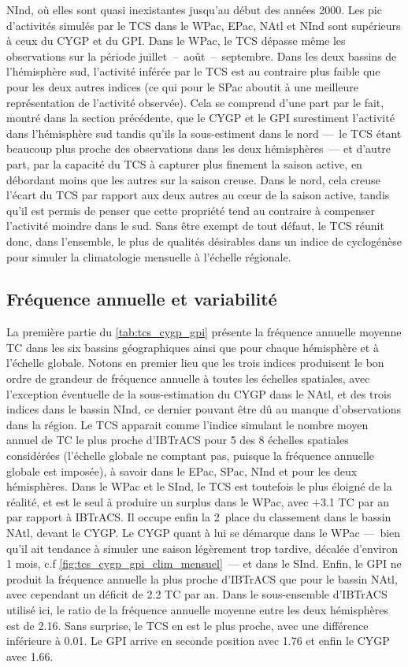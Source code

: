 \documentclass[../main.tex]{subfiles}
\begin{document}
NInd, où elles sont quasi inexistantes jusqu'au début des années 2000. Les pic d'activités simulés par le TCS dans le WPac, EPac, NAtl et NInd sont
supérieurs à ceux du CYGP et du GPI. Dans le WPac, le TCS dépasse même les observations sur la période juillet~--~août~--~septembre. Dans les deux bassins de
l'hémisphère sud, l'activité inférée par le TCS est au contraire plus faible que pour les deux autres indices (ce qui pour le SPac aboutit à une meilleure
représentation de l'activité observée). Cela se comprend d'une part par le fait, montré dans la section précédente, que le CYGP et le GPI surestiment l'activité
dans l'hémisphère sud tandis qu'ils la sous-estiment dans le nord ---~le TCS étant beaucoup plus proche des observations dans les deux hémisphères~--- et
d'autre part, par la capacité du TCS à capturer plus finement la saison active, en débordant moins que les autres sur la saison creuse. Dans le nord, cela
creuse l'écart du TCS par rapport aux deux autres au cœur de la saison active, tandis qu'il est permis de penser que cette propriété tend au contraire à
compenser l'activité moindre dans le sud. Sans être exempt de tout défaut, le TCS réunit donc, dans l'ensemble, le plus de qualités désirables dans un indice de
cyclogénèse pour simuler la climatologie mensuelle à l'échelle régionale.
\subsection*{Fréquence annuelle et variabilité}

La première partie du \cref{tab:tcs_cygp_gpi} présente la fréquence annuelle moyenne TC dans les six bassins géographiques ainsi que pour chaque hémisphère et à
l'échelle globale. Notons en premier lieu que les trois indices produisent le bon ordre de grandeur de fréquence annuelle à toutes les échelles spatiales, avec
l'exception éventuelle de la sous-estimation du CYGP dans le NAtl, et des trois indices dans le bassin NInd, ce dernier pouvant être dû au manque
d'observations dans la région. Le TCS apparait comme l'indice simulant le nombre moyen annuel de TC le plus proche d'IBTrACS pour \num{5} des \num{8} échelles
spatiales considérées (l'échelle globale ne comptant pas, puisque la fréquence annuelle globale est imposée), à savoir dans le EPac, SPac, NInd et pour les deux
hémisphères. Dans le WPac et le SInd, le TCS est toutefois le plus éloigné de la réalité, et est le seul à produire un surplus dans le WPac, avec $+$\num{3.1}
TC par an par rapport à IBTrACS. Il occupe enfin la 2\ieme~place du classement dans le bassin NAtl, devant le CYGP. Le CYGP quant à lui se démarque dans le WPac
---~bien qu'il ait tendance à simuler une saison légèrement trop tardive, décalée d'environ 1 mois, c.f \cref{fig:tcs_cygp_gpi_clim_mensuel}~--- et dans le
SInd. Enfin, le GPI ne produit la fréquence annuelle la plus proche d'IBTrACS que pour le bassin NAtl, avec cependant un déficit de \num{2.2} TC par an. Dans le
sous-ensemble d'IBTrACS utilisé ici, le ratio de la fréquence annuelle moyenne entre les deux hémisphères est de \num{2.16}. Sans surprise, le TCS en est le
plus proche, avec une différence inférieure à \num{0.01}. Le GPI arrive en seconde position avec \num{1.76} et enfin le CYGP avec \num{1.66}.
\end{document}
